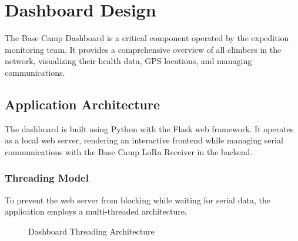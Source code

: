 \chapter{Dashboard Design}
\label{ch:dashboard_design}

The Base Camp Dashboard is a critical component operated by the expedition monitoring team. It provides a comprehensive overview of all climbers in the network, visualizing their health data, GPS locations, and managing communications.

\section{Application Architecture}

The dashboard is built using Python with the Flask web framework. It operates as a local web server, rendering an interactive frontend while managing serial communications with the Base Camp LoRa Receiver in the backend.

\subsection{Threading Model}

To prevent the web server from blocking while waiting for serial data, the application employs a multi-threaded architecture.

\begin{figure}[htbp]
    \centering
    \caption{Dashboard Threading Architecture}
    \label{fig:dashboard_threading}
\end{figure}


